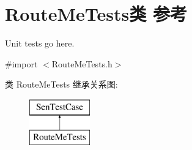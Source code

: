 \hypertarget{interface_route_me_tests}{\section{Route\-Me\-Tests类 参考}
\label{interface_route_me_tests}
}


Unit tests go here.  




{\ttfamily \#import $<$Route\-Me\-Tests.\-h$>$}

类 Route\-Me\-Tests 继承关系图\-:\begin{figure}[H]
\begin{center}
\leavevmode
\includegraphics[height=2.000000cm]{interface_route_me_tests}
\end{center}
\end{figure}

